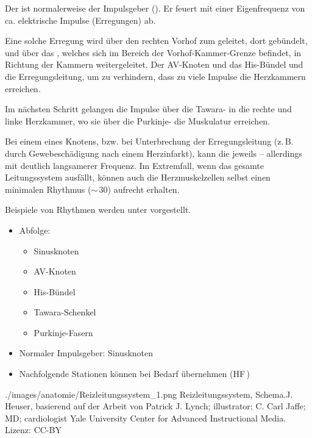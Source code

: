 {%
Der   ist normalerweise der
Impulsgeber (). Er feuert mit
einer Eigenfrequenz von ca.
\PerMin* elektrische Impulse (Erregungen)
ab.

Eine solche Erregung wird über den rechten Vorhof zum 
  geleitet, dort gebündelt, und über
das , welches sich im Bereich der
Vorhof-Kammer-Grenze befindet, in Richtung der Kammern
weitergeleitet. Der AV-Knoten und das His-Bündel 
 und  die Erregungsleitung, um zu
verhindern, dass zu viele Impulse die Herzkammern erreichen.

Im nächsten Schritt gelangen die Impulse über die
Tawara- in die rechte und linke Herzkammer, wo
sie über die Purkinje- die Muskulatur erreichen.

Bei einem  eines Knotens, bzw. bei Unterbrechung
der Erregungsleitung (z.\,B. durch Gewebeschädigung nach
einem Herzinfarkt), kann die jeweils  -- allerdings mit deutlich
langsamerer Frequenz. Im Extremfall, wenn
das gesamte Leitungssystem ausfällt, können auch die
Herzmuskelzellen selbst einen minimalen Rhythmus
($\sim$\,30\PerMin*) aufrecht erhalten.


Beispiele von Rhythmen werden unter 
vorgestellt. 
}
{
\begin{itemize}
  \item Abfolge:
  \begin{itemize}
    \item Sinusknoten 
    \item AV-Knoten 
    \item His-Bündel
    \item Tawara-Schenkel
    \item Purkinje-Fasern
  \end{itemize}
  \item Normaler Impulsgeber: Sinusknoten
  \item Nachfolgende Stationen können bei Bedarf übernehmen (HF\,)
\end{itemize}

}{./images/anatomie/Reizleitungssystem_1.png}{
Reizleitungssystem, Schema.}{J. Heuser,
basierend auf der Arbeit von Patrick J. Lynch; illustrator;
C. Carl Jaffe; MD; cardiologist Yale University Center for
Advanced Instructional Media. Lizenz: CC-BY}


